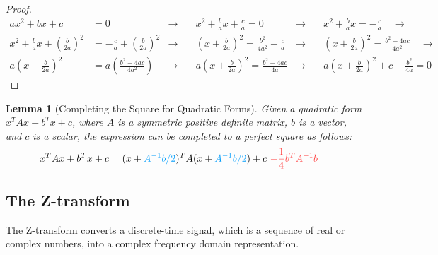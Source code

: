 \documentclass[a4 paper]{article}
\numberwithin{equation}{section}
\theoremstyle{boldStyle}
\theoremstyle{boldBlueStyle}
\newtheorem{lemma}{Lemma}[section]
\theoremstyle{boldPurpleStyle}
\theoremstyle{boldRedStyle}
\theoremstyle{boldGreenStyle}
\begin{document}
\begin{proof}
  \begin{align*}
    ax^2 + bx + c &= 0 &\rightarrow\quad & x^2 + \frac{b}{a}x + \frac{c}{a} = 0 &\rightarrow\quad& x^2 + 
    \frac{b}{a}x = -\frac{c}{a} \quad \rightarrow \\
    x^2 + \frac{b}{a}x + \left( \frac{b}{2a} \right)^2 &= -\frac{c}{a} + \left( \frac{b}{2a} \right)^2 
    &\rightarrow\quad& \left( x + \frac{b}{2a} \right)^2 = \frac{b^2}{4a^2} - \frac{c}{a} &\rightarrow\quad& 
    \left( x + \frac{b}{2a} \right)^2 = \frac{b^2 - 4ac}{4a^2} \quad \rightarrow \\
    a\left( x + \frac{b}{2a} \right)^2 &= a\left( \frac{b^2 - 4ac}{4a^2} \right) 
    &\rightarrow\quad& a\left( x + \frac{b}{2a} \right)^2 = \frac{b^2 - 4ac}{4a} 
    &\rightarrow\quad& a\left( x + \frac{b}{2a} \right)^2 + c - \frac{b^2}{4a} = 0
    \end{align*}
\end{proof}

\begin{lemma}[Completing the Square for Quadratic Forms]
  Given a quadratic form \( x^T A x + b^T x + c \), where \( A \) is a symmetric positive definite matrix, \( b \) is a vector, 
  and \( c \) is a scalar, the expression can be completed to a perfect square as follows:
  \begin{align*}
    x^T A x + b^T x + c &= (x + \tblu{A^{-1} b/2})^T A (x + \tblu{A^{-1} b/2}) + c \text{ } \tred{ - \frac{1}{4} b^T A^{-1} b}
  \end{align*}
\end{lemma}









\newpage
\subsection{The Z-transform}

The Z-transform converts a discrete-time signal, which is a sequence of real or complex numbers, into a complex frequency domain representation. 
\end{document}
